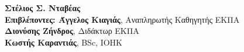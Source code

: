 \begin{center}
    \textbf{Στέλιος Σ. Νταβέας} \\
    \vspace{2.5cm}
    \textbf{Επιβλέποντες: Άγγελος Κιαγιάς}, Αναπληρωτής Καθηγητής ΕΚΠΑ\\
    \hspace{0.52cm}
    \textbf{Διονύσης Ζήνδρος}, Διδάκτωρ ΕΚΠΑ\\
    \hspace{-1.40cm}
    \textbf{Κωστής Καραντιάς}, BSc, IOHK

    \vspace{2.0cm}

    \date{\textbf{ΑΘΗΝΑ}, \\ \textbf{ΙΟΥΝΙΟΣ 2020}}
    \pagebreak
\end{center}

